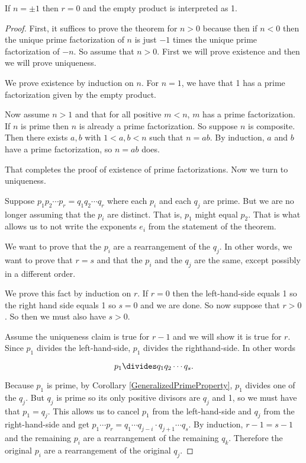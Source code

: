 \documentclass[oneside,12pt]{amsart}
\begin{document}
If $n=\pm 1$ then $r=0$ and the empty product is interpreted as 1.

\begin{proof}
 First, it suffices to prove the theorem for $n > 0$ because then
if $n < 0$ then the unique prime factorization of $n$ is just $-1$ times the
unique prime factorization of $-n$. So assume that $n > 0$.
First we will prove existence and then we will prove uniqueness.

We prove existence by induction on $n$. For $n = 1$, we have that 1
has a prime factorization given by the empty product.

Now assume $n > 1$ and that for all positive $m < n$, $m$ has a prime
factorization. If $n$ is prime then $n$ is already a prime factorization.
So suppose $n$ is composite. Then there exists $a, b$ with $1 < a, b < n$
such that $n = ab$. By induction, $a$ and $b$ have a prime factorization, so
$n = ab$ does.

That completes the proof of existence of prime factorizations. Now
we turn to uniqueness.


Suppose $p_1 p_2 \cdots p_r = q_1 q_2 \cdots q_r$ where each $p_i$ and each $q_j$ are 
prime.
But we are no longer assuming that the $p_i$ are distinct. That is, $p_1$
might equal $p_2$. That is what allows us to not write the exponents $e_i$
from the statement of the theorem.

We want to prove that the $p_i$ are a rearrangement of the $q_j$.
In other
words, we want to prove that $r = s$ and that the $p_i$ and the $q_j$ are the
same, except possibly in a different order.


We prove this fact by induction on $r$. If $r = 0$ then the left-hand-side
equals 1 so the right hand side equals 1 so $s = 0$ and we are done. So
now suppose that $r > 0$. So then we must also have $s > 0$.

Assume the uniqueness claim is true for $r - 1$ and we will show it
is true for $r$. Since $p_1$ divides the left-hand-side, $p_1$ divides the 
righthand-side. In other words

$$p_1 \divides q_1 q_2 \cdots q_s.$$

Because $p_1$ is prime, by Corollary \ref{GeneralizedPrimeProperty},
$p_1$ divides one of the $q_j$.
But $q_j$
is prime so its only positive divisors are $q_j$ and 1, so we must have
that $p_1=q_j$.
This allows us to cancel $p_1$ from the left-hand-side and $q_j$
from the right-hand-side and get 
$p_1\cdots p_r = q_1 \cdots q_{j-i} \cdot q_{j+1} \cdots q_s$. By
induction, $r - 1 = s - 1$ and the remaining $p_i$ are a rearrangement of
the remaining $q_k$. Therefore the original $p_i$ are a rearrangement of the
original $q_j$.
\end{proof}
\end{document}
